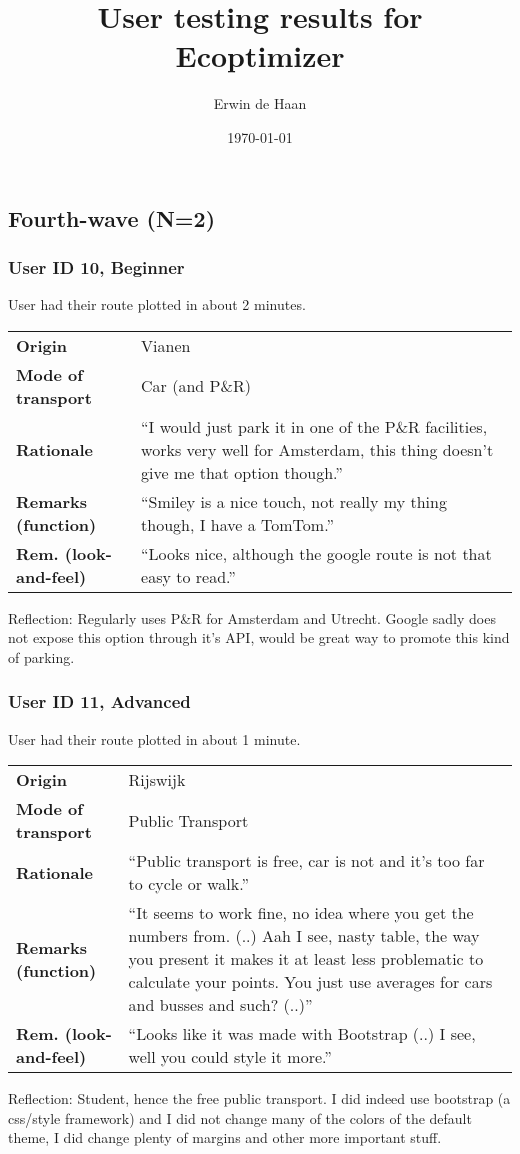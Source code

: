 \documentclass[final,a4paper,11pt]{article}
\author{Erwin de Haan}
\title{User testing results for Ecoptimizer}
\date{\today}
\newlength{\resulttablecolone}
\newlength{\resulttablecoltwo}
\begin{document}
\maketitle

\subsection*{Fourth-wave (N=2)}
\subsubsection*{User ID 10, Beginner}
User had their route plotted in about 2 minutes.
\begin{table}[H]
\begin{tabular}{p{\resulttablecolone}|p{\resulttablecoltwo}}
\textbf{Origin} & Vianen \\
\textbf{Mode of transport} & Car (and P\&R) \\
\textbf{Rationale} & ``I would just park it in one of the P\&R facilities, works very well for Amsterdam, this thing doesn't give me that option though.'' \\
\textbf{Remarks (function)} & ``Smiley is a nice touch, not really my thing though, I have a TomTom.'' \\
\textbf{Rem. (look-and-feel)} & ``Looks nice, although the google route is not that easy to read.'' \\
\end{tabular}
\end{table}
Reflection: Regularly uses P\&R for Amsterdam and Utrecht. Google sadly does not expose this option through it's API, would be great way to promote this kind of parking.

\subsubsection*{User ID 11, Advanced}
User had their route plotted in about 1 minute.
\begin{table}[H]
\begin{tabular}{p{\resulttablecolone}|p{\resulttablecoltwo}}
\textbf{Origin} & Rijswijk \\
\textbf{Mode of transport} & Public Transport \\
\textbf{Rationale} & ``Public transport is free, car is not and it's too far to cycle or walk.'' \\
\textbf{Remarks (function)} & ``It seems to work fine, no idea where you get the numbers from. (..) Aah I see, nasty table, the way you present it makes it at least less problematic to calculate your points. You just use averages for cars and busses and such? (..)'' \\
\textbf{Rem. (look-and-feel)} & ``Looks like it was made with Bootstrap (..) I see, well you could style it more.'' \\
\end{tabular}
\end{table}
Reflection: Student, hence the free public transport. I did indeed use bootstrap (a css/style framework) and I did not change many of the colors of the default theme, I did change plenty of margins and other more important stuff.
\end{document}
